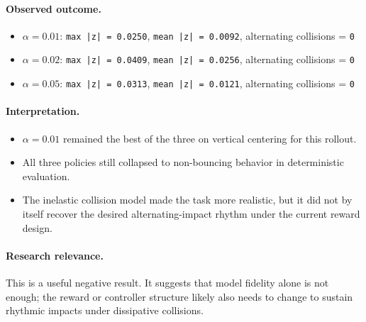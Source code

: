 \documentclass[11pt]{article}
\begin{document}
\paragraph{Observed outcome.}
\begin{itemize}[leftmargin=1.5em]
  \item $\alpha = 0.01$: \texttt{max |z| = 0.0250}, \texttt{mean |z| = 0.0092}, alternating collisions = \texttt{0}
  \item $\alpha = 0.02$: \texttt{max |z| = 0.0409}, \texttt{mean |z| = 0.0256}, alternating collisions = \texttt{0}
  \item $\alpha = 0.05$: \texttt{max |z| = 0.0313}, \texttt{mean |z| = 0.0121}, alternating collisions = \texttt{0}
\end{itemize}

\paragraph{Interpretation.}
\begin{itemize}[leftmargin=1.5em]
  \item $\alpha = 0.01$ remained the best of the three on vertical centering for this rollout.
  \item All three policies still collapsed to non-bouncing behavior in deterministic evaluation.
  \item The inelastic collision model made the task more realistic, but it did not by itself recover the desired alternating-impact rhythm under the current reward design.
\end{itemize}

\paragraph{Research relevance.}
This is a useful negative result. It suggests that model fidelity alone is not enough; the reward or controller structure likely also needs to change to sustain rhythmic impacts under dissipative collisions.
\end{document}

